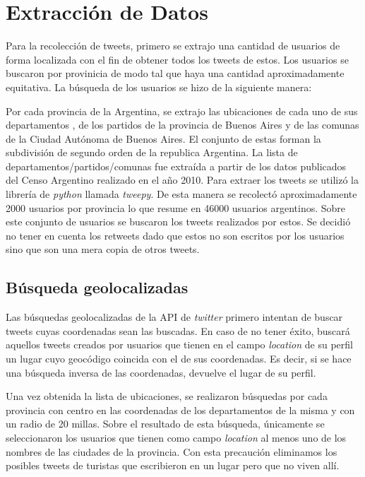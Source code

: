 

\section{Extracción de Datos}

Para la recolección de tweets, primero se extrajo una cantidad de usuarios de forma localizada con el fin de obtener todos los tweets de estos.
Los usuarios se buscaron por provinicia de modo tal que haya una cantidad aproximadamente equitativa.
La búsqueda de los usuarios se hizo de la siguiente manera:

Por cada provincia de la Argentina, se extrajo las ubicaciones de cada uno de sus departamentos , de los partidos de la provincia de Buenos Aires y de las comunas de la Ciudad Autónoma de Buenos Aires. El conjunto de estas forman la subdivisión de segundo orden de la republica Argentina. La lista de departamentos/partidos/comunas fue extraída a partir de los datos publicados del Censo Argentino realizado en el año 2010. Para extraer los tweets se utilizó la librería de \textit{python} llamada \textit{tweepy}.
De esta manera se recolectó aproximadamente 2000 usuarios por provincia lo que resume en 46000 usuarios argentinos. Sobre este conjunto de usuarios se buscaron los tweets realizados por estos. Se decidió no tener en cuenta los retweets dado que estos no son escritos por los usuarios sino que son una mera copia de otros tweets. 


\subsection{Búsqueda geolocalizadas}

Las búsquedas geolocalizadas de la API de \textit{twitter} primero intentan de buscar tweets cuyas coordenadas sean las buscadas. En caso de no tener éxito, buscará aquellos tweets creados por usuarios que tienen en el campo \textit{location} de su perfil un lugar cuyo geocódigo coincida con el de sus coordenadas. Es decir, si se hace una búsqueda inversa de las coordenadas, devuelve el lugar de su perfil.

Una vez obtenida la lista de ubicaciones, se realizaron búsquedas por cada provincia con centro en las coordenadas de los departamentos de la misma y con un radio de 20 millas. Sobre el resultado de esta búsqueda, únicamente se seleccionaron los usuarios que tienen como campo \textit{location} al menos uno de los nombres de las ciudades de la provincia. Con esta precaución eliminamos los posibles tweets de turistas que escribieron en un lugar pero que no viven allí.

